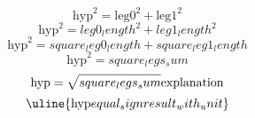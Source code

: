 \[\text{{{hyp}}}^{{2}}=\text{{{leg0}}}^{{2}}+\text{{{leg1}}}^{{2}}\]
\[\text{{{hyp}}}^{{2}}={leg0_length}^{{2}}+{leg1_length}^{{2}}\]
\[\text{{{hyp}}}^{{2}}={square_leg0_length}+{square_leg1_length}\]
\[\text{{{hyp}}}^{{2}}={square_legs_sum}\]
\[\text{{{hyp}}}=\sqrt{{\mathstrut {square_legs_sum}}}\text{{{explanation}}}\]
\[\uline{{\text{{{hyp}}}{equal_sign}{result_with_unit}}}\]
